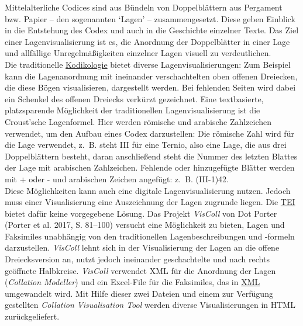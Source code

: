 \documentclass{article}
\begin{document}
    Mittelalterliche Codices sind aus Bündeln von Doppelblättern aus Pergament bzw. Papier – den sogenannten ‘Lagen’ – zusammengesetzt. Diese geben Einblick in die Entstehung des Codex und auch in die Geschichte einzelner Texte. Das Ziel einer Lagenvisualisierung ist es, die Anordnung der Doppelblätter in einer Lage und allfällige Unregelmäßigkeiten einzelner Lagen visuell zu verdeutlichen. \\
            
        Die traditionelle \href{http://gams.uni-graz.at/o:konde.103}{Kodikologie} bietet diverse Lagenvisualisierungen: Zum Beispiel kann die Lagenanordnung mit ineinander verschachtelten oben offenen Dreiecken, die diese Bögen visualisieren, dargestellt werden. Bei fehlenden Seiten wird dabei ein Schenkel des offenen Dreiecks verkürzt gezeichnet. Eine textbasierte, platzsparende Möglichkeit der traditionellen Lagenvisualisierung ist die Croust’sche Lagenformel. Hier werden römische und arabische Zahlzeichen verwendet, um den Aufbau eines Codex darzustellen: Die römische Zahl wird für die Lage verwendet, z. B. steht III für eine Ternio, also eine Lage, die aus drei Doppelblättern besteht, daran anschließend steht die Nummer des letzten Blattes der Lage mit arabischen Zahlzeichen. Fehlende oder hinzugefügte Blätter werden mit + oder - und arabischen Zeichen angefügt: z. B. (III-1)42.\\
            
        Diese Möglichkeiten kann auch eine digitale Lagenvisualisierung nutzen. Jedoch muss einer Visualisierung eine Auszeichnung der Lagen zugrunde liegen. Die \href{http://gams.uni-graz.at/o:konde.178}{TEI} bietet dafür keine vorgegebene Lösung. Das Projekt \emph{VisColl} von Dot Porter (Porter et al. 2017, S. 81–100) versucht eine Möglichkeit zu bieten, Lagen und Faksimiles unabhängig von den traditionellen Lagenbeschreibungen und -formeln darzustellen. \emph{VisColl} lehnt sich in der Visualisierung der Lagen an die offene Dreiecksversion an, nutzt jedoch ineinander geschachtelte und nach rechts geöffnete Halbkreise. \emph{VisColl} verwendet XML für die Anordnung der Lagen (\emph{Collation Modeller}) und ein Excel-File für die Faksimiles, das in \href{http://gams.uni-graz.at/o:konde.215}{XML} umgewandelt wird. Mit Hilfe dieser zwei Dateien und einem zur Verfügung gestellten \emph{Collation Visualisation Tool} werden diverse Visualisierungen in HTML zurückgeliefert.\\
            
\end{document}
